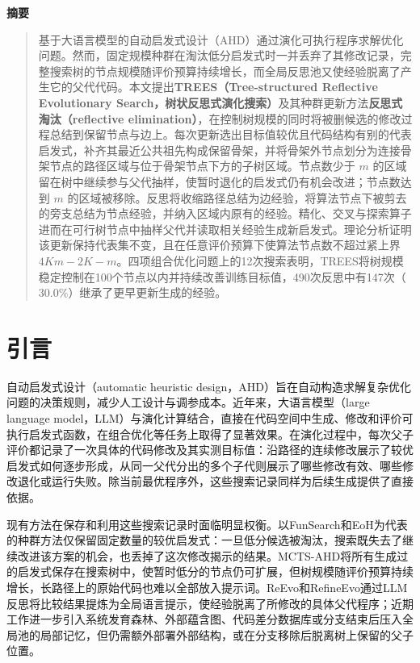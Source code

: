\documentclass{article}
\renewenvironment{abstract}
{\centerline{\large\bf 摘要}
 \vspace{-0.12in}\begin{quote}}
{\par\end{quote}\vskip0.12in}
\begin{document}
\printAffiliationsAndNotice{}
\begin{abstract}
基于大语言模型的自动启发式设计（AHD）通过演化可执行程序求解优化问题。然而，固定规模种群在淘汰低分启发式时一并丢弃了其修改记录，完整搜索树的节点规模随评价预算持续增长，而全局反思池又使经验脱离了产生它的父代代码。本文提出\textbf{TREES（Tree-structured Reflective Evolutionary Search，树状反思式演化搜索）}及其种群更新方法\textbf{反思式淘汰（reflective elimination）}，在控制树规模的同时将被删候选的修改过程总结到保留节点与边上。每次更新选出目标值较优且代码结构有别的代表启发式，补齐其最近公共祖先构成保留骨架，并将骨架外节点划分为连接骨架节点的路径区域与位于骨架节点下方的子树区域。节点数少于 \(m\) 的区域留在树中继续参与父代抽样，使暂时退化的启发式仍有机会改进；节点数达到 \(m\) 的区域被移除。反思将收缩路径总结为边经验，将算法节点下被剪去的旁支总结为节点经验，并纳入区域内原有的经验。精化、交叉与探索算子进而在可行树节点中抽样父代并读取相关经验生成新启发式。理论分析证明该更新保持代表集不变，且在任意评价预算下使算法节点数不超过紧上界 \(4Km-2K-m\)。四项组合优化问题上的12次搜索表明，TREES将树规模稳定控制在100个节点以内并持续改善训练目标值，490次反思中有147次（\(30.0\%\)）继承了更早更新生成的经验。
\end{abstract}

\section{引言}\label{ux5f15ux8a00}

自动启发式设计（automatic heuristic design，AHD）旨在自动构造求解复杂优化问题的决策规则，减少人工设计与调参成本\citep{hh, irace}。近年来，大语言模型（large language model，LLM）与演化计算结合，直接在代码空间中生成、修改和评价可执行启发式函数，在组合优化等任务上取得了显著效果\citep{funsearch, eoh, llamea, survey_aad}。在演化过程中，每次父子评价都记录了一次具体的代码修改及其实测目标值：沿路径的连续修改展示了较优启发式如何逐步形成，从同一父代分出的多个子代则展示了哪些修改有效、哪些修改退化或运行失败。除当前最优程序外，这些搜索记录同样为后续生成提供了直接依据。

现有方法在保存和利用这些搜索记录时面临明显权衡。以FunSearch\citep{funsearch}和EoH\citep{eoh}为代表的种群方法仅保留固定数量的较优启发式：一旦低分候选被淘汰，搜索既失去了继续改进该方案的机会，也丢掉了这次修改揭示的结果。MCTS-AHD\citep{mctsahd}将所有生成过的启发式保存在搜索树中，使暂时低分的节点仍可扩展，但树规模随评价预算持续增长，长路径上的原始代码也难以全部放入提示词。ReEvo\citep{reevo}和RefineEvo\citep{refineevo}通过LLM反思将比较结果提炼为全局语言提示，使经验脱离了所修改的具体父代程序；近期工作进一步引入系统发育森林\citep{phyloevolve}、外部蕴含图\citep{pathwise}、代码差分数据库\citep{deltaevolve}或分支结束后压入全局池的局部记忆\citep{memorytree}，但仍需额外部署外部结构，或在分支移除后脱离树上保留的父子位置。
\end{document}
